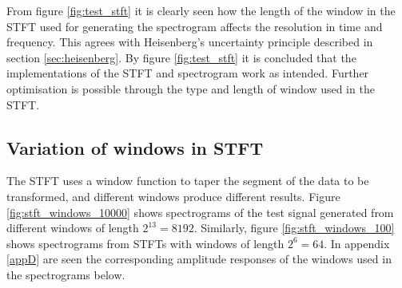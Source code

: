 From figure \ref{fig:test_stft} it is clearly seen how the length of the window in the STFT used for generating the spectrogram affects the resolution in time and frequency. This agrees with Heisenberg's uncertainty principle described in section \ref{sec:heisenberg}. By figure \ref{fig:test_stft} it is concluded that the implementations of the STFT and spectrogram work as intended. Further optimisation is possible through the type and length of window used in the STFT.

\subsection{Variation of windows in STFT}\label{sec:STFT_variation}
The STFT uses a window function to taper the segment of the data to be transformed, and different windows produce different results. Figure \ref{fig:stft_windows_10000} shows spectrograms of the test signal generated from different windows of length $2^{13}=8192$. Similarly, figure \ref{fig:stft_windows_100} shows spectrograms from STFTs with windows of length $2^6=64$. In appendix \ref{appD} are seen the corresponding amplitude responses of the windows used in the spectrograms below.
